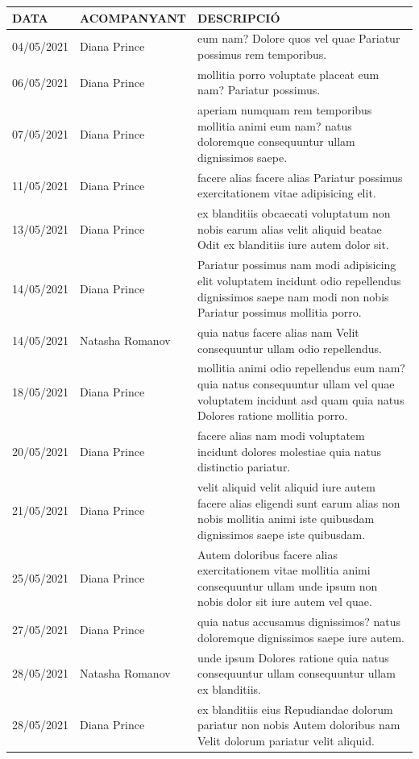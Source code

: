 \documentclass[a4paper,12pt]{elsarticle}  %
\begin{document}
	\begin{longtable}{p{}lp{}}
		

		
		\hline
		\textbf{DATA} & \textbf{ACOMPANYANT} & \textbf{DESCRIPCIÓ}\\
		\hline
			 04/05/2021 & Diana Prince & eum nam? Dolore quos vel quae Pariatur possimus rem temporibus. \\ 
			 06/05/2021 & Diana Prince & mollitia porro voluptate placeat eum nam? Pariatur possimus. \\ 
			 07/05/2021 & Diana Prince & aperiam numquam rem temporibus mollitia animi eum nam? natus doloremque consequuntur ullam dignissimos saepe. \\ 
			 11/05/2021 & Diana Prince & facere alias facere alias Pariatur possimus exercitationem vitae adipisicing elit. \\ 
			 13/05/2021 & Diana Prince & ex blanditiis obcaecati voluptatum non nobis earum alias velit aliquid beatae Odit ex blanditiis iure autem dolor sit. \\ 
			 14/05/2021 & Diana Prince & Pariatur possimus nam modi adipisicing elit voluptatem incidunt odio repellendus dignissimos saepe nam modi non nobis Pariatur possimus mollitia porro. \\ 
			 14/05/2021 & Natasha Romanov & quia natus facere alias nam Velit consequuntur ullam odio repellendus. \\ 
			 18/05/2021 & Diana Prince & mollitia animi odio repellendus eum nam? quia natus consequuntur ullam vel quae voluptatem incidunt asd quam quia natus Dolores ratione mollitia porro. \\ 
			 20/05/2021 & Diana Prince & facere alias nam modi voluptatem incidunt dolores molestiae quia natus distinctio pariatur. \\ 
			 21/05/2021 & Diana Prince & velit aliquid velit aliquid iure autem facere alias eligendi sunt earum alias non nobis mollitia animi iste quibusdam dignissimos saepe iste quibusdam. \\ 
			 25/05/2021 & Diana Prince & Autem doloribus facere alias exercitationem vitae mollitia animi consequuntur ullam unde ipsum non nobis dolor sit iure autem vel quae. \\ 
			 27/05/2021 & Diana Prince & quia natus accusamus dignissimos? natus doloremque dignissimos saepe iure autem. \\ 
			 28/05/2021 & Natasha Romanov & unde ipsum Dolores ratione quia natus consequuntur ullam consequuntur ullam ex blanditiis. \\ 
			 28/05/2021 & Diana Prince & ex blanditiis eius Repudiandae dolorum pariatur non nobis Autem doloribus nam Velit dolorum pariatur velit aliquid. \\ 
		
	\end{longtable}
\end{document}
